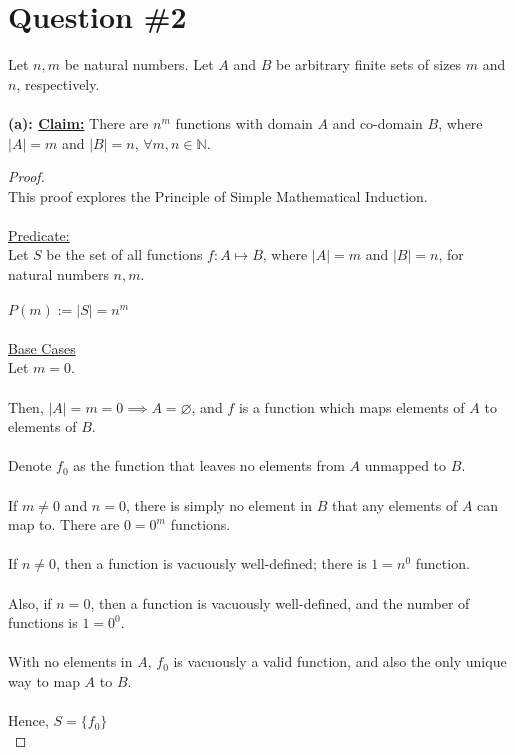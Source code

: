 \documentclass[12pt]{article}
\begin{document}
\section*{Question \#2}
Let $n, m$ be natural numbers. Let $A$ and $B$ be arbitrary finite sets of sizes $m$ and $n$, respectively. \\
\\
\textbf{(a): \underline{Claim:}} There are $n^m$ functions with domain $A$ and co-domain $B$, where $|A| = m$ and $|B| = n$, $\forall m, n \in \mathbb{N}$.
\begin{proof}
\leavevmode\\
    This proof explores the Principle of Simple Mathematical Induction. \\
    \\
    \underline{Predicate:} \\
    Let $S$ be the set of all functions $f: A \mapsto B$, where $|A| = m$ and $|B| = n$, for natural numbers $n, m$. \\
    \\
    $P(m):= |S| = n^m$ \\
    \\
    \underline{Base Cases} \\
    Let $m = 0$. \\
    \\
    Then, $|A| = m = 0 \implies A = \varnothing$, and $f$ is a function which maps elements of $A$ to elements of $B$. \\
    \\
    Denote $f_0$ as the function that leaves no elements from $A$ unmapped to $B$. \\
    \\
    If $m \neq 0$ and $n = 0$, there is simply no element in $B$ that any elements of $A$ can map to. There are $0 = 0^m$ functions. \\
    \\
    If $n \neq 0$, then a function is vacuously well-defined; there is $1 = n^0$ function. \\
    \\
    Also, if $n = 0$, then a function is vacuously well-defined, and the number of functions is $1 = 0^0$. \\
    \\
    With no elements in $A$, $f_0$ is vacuously a valid function, and also the only unique way to map $A$ to $B$. \\
    \\
    Hence, $S = \{f_0\}$ \\

\end{proof}
\end{document}
